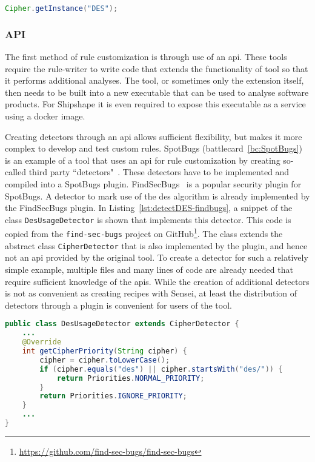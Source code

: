\begin{lstlisting}[language={Java},caption={Insecure use of a deprecated cryptographic algorithm},label={lst:useDES},abovecaptionskip=-0.0pt,xleftmargin=15pt]
Cipher.getInstance("DES");
\end{lstlisting}

\subsubsection{API}
The first method of rule customization is through use of an \gls{api}.
These tools require the rule-writer to write code that extends the functionality of tool so that it performs additional analyses.
The tool, or sometimes only the extension itself, then needs to be built into a new executable that can be used to analyse software products.
For Shipshape it is even required to expose this executable as a service using a docker image.

Creating detectors through an \gls{api} allows sufficient flexibility, but makes it more complex to develop and test custom rules.
SpotBugs (battlecard~\ref{bc:SpotBugs}) is an example of a tool that uses an \gls{api} for rule customization by creating so-called third party ``detectors"~\cite{spotbugsapi}.
These detectors have to be implemented and compiled into a SpotBugs plugin.
FindSecBugs~\cite{findsecbugs} is a popular security plugin for SpotBugs.
A detector to mark use of the \gls{des} algorithm is already implemented by the FindSecBugs plugin.
In Listing~\ref{lst:detectDES-findbugs}, a snippet of the class \texttt{DesUsageDetector} is shown that implements this detector.
This code is copied from the \texttt{find-sec-bugs} project on GitHub\footnote{\url{https://github.com/find-sec-bugs/find-sec-bugs}}.
The class extends the abstract class \texttt{CipherDetector} that is also implemented by the plugin, and hence not an \gls{api} provided by the original tool.
To create a detector for such a relatively simple example, multiple files and many lines of code are already needed that require sufficient knowledge of the \glspl{api}.
While the creation of additional detectors is not as convenient as creating recipes with Sensei, at least the distribution of detectors through a plugin is convenient for users of the tool.

\begin{lstlisting}[language={Java},caption={Rule customization of SpotBugs is done through java code using their API.},label={lst:detectDES-findbugs},abovecaptionskip=-0.0pt,xleftmargin=15pt]
public class DesUsageDetector extends CipherDetector {
    ...
    @Override
    int getCipherPriority(String cipher) {
        cipher = cipher.toLowerCase();
        if (cipher.equals("des") || cipher.startsWith("des/")) {
            return Priorities.NORMAL_PRIORITY;
        }
        return Priorities.IGNORE_PRIORITY;
    }
    ...
}
\end{lstlisting}

